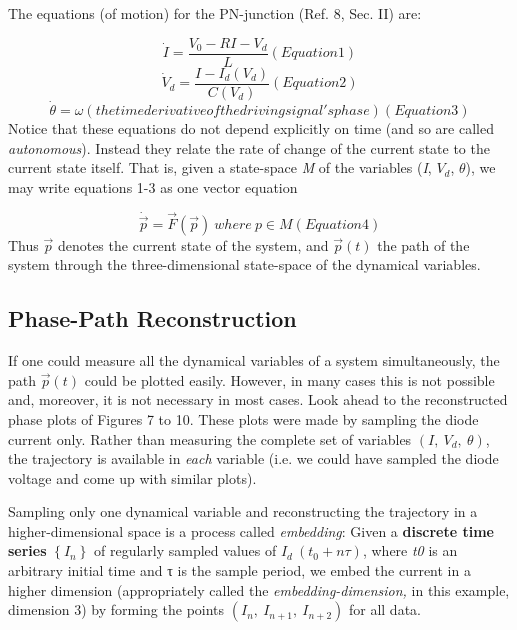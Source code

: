 \documentclass{../lab}
\begin{document}
The equations (of motion) for the PN-junction (Ref. 8, Sec. II) are:

\begin{equation}
    \dot I = \frac{V_0-RI-V_d}{L}  (Equation 1)
\end{equation}
\begin{equation}
    \dot V_d = \frac{I-I_d(V_d)}{C(V_d)}  (Equation 2)
\end{equation}
\begin{equation}
    \dot \theta =\omega  (the time derivative of the driving signal's phase) (Equation 3)
\end{equation}
Notice that these equations do not depend explicitly on time (and so are called \emph{autonomous}). Instead they relate the rate of change of the current state to the current state itself. That is, given a state-space \emph{M} of the variables (\emph{I}, $V_d$, $ \theta $), we may write equations 1-3 as one vector equation

\begin{equation}
    \dot{\vec p}=\vec F (\vec p)~where~p \in M  (Equation 4)
\end{equation}
Thus $ \vec p $ denotes the current state of the system, and $ \vec p(t) $ the path of the system through the three-dimensional state-space of the dynamical variables.

\subsection{Phase-Path Reconstruction}

If one could measure all the dynamical variables of a system simultaneously, the path $ \vec p(t) $ could be plotted easily. However, in many cases this is not possible and, moreover, it is not necessary in most cases. Look ahead to the reconstructed phase plots of Figures 7 to 10. These plots were made by sampling the diode current only. Rather than measuring the complete set of variables $ (I,~V_d,~\theta) $, the trajectory is available in \emph{each} variable (i.e. we could have sampled the diode voltage and come up with similar plots).

Sampling only one dynamical variable and reconstructing the trajectory in a higher-dimensional space is a process called \emph{embedding}: Given a \textbf{discrete time series} $ \left \{I_n \right\} $ of regularly sampled values of $ I_d~(t_0+n\tau) $, where \emph{t0} is an arbitrary initial time and τ is the sample period, we embed the current in a higher dimension (appropriately called the \emph{embedding-dimension,} in this example, dimension 3) by forming the points $ (I_n,~I_{n+1},~I_{n+2}) $ for all data.
\end{document}
